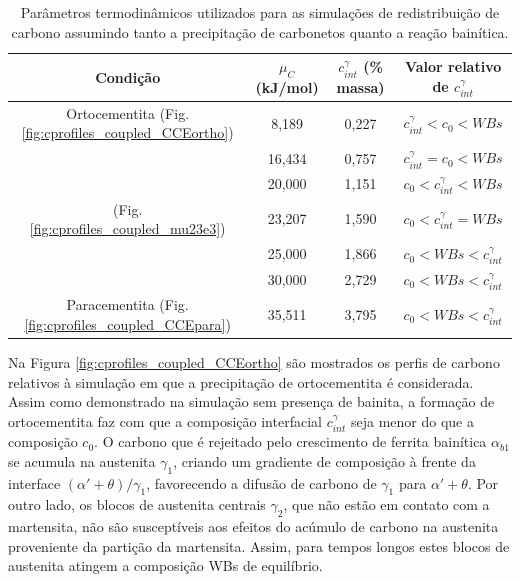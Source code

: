 \begin{table}
  \centering
  \caption{Parâmetros termodinâmicos utilizados para as simulações de redistribuição de carbono assumindo tanto a precipitação de carbonetos quanto a reação bainítica.}
  \begin{tabular}{cccc}
    \hline
    Condição & $\mu_C$ (kJ/mol) & $c^\gamma_{int}$ (\% massa) & Valor relativo de $c^\gamma_{int}$\\
    \hline
    Ortocementita (Fig. \ref{fig:cprofiles_coupled_CCEortho}) & 8,189 & 0,227 & $c^\gamma_{int} < c_0 < WBs$ \\
    & 16,434 & 0,757 & $c^\gamma_{int} = c_0 < WBs$ \\
    & 20,000 & 1,151 & $c_0 < c^\gamma_{int} < WBs$ \\
    (Fig. \ref{fig:cprofiles_coupled_mu23e3}) & 23,207 & 1,590 & $c_0 < c^\gamma_{int} = WBs$ \\
    & 25,000 & 1,866 & $c_0 < WBs < c^\gamma_{int}$ \\
    & 30,000 & 2,729 & $c_0 < WBs < c^\gamma_{int}$ \\
    Paracementita (Fig. \ref{fig:cprofiles_coupled_CCEpara}) & 35,511 & 3,795 & $c_0 < WBs < c^\gamma_{int}$ \\
    \hline
  \end{tabular}
  \label{tab:cpartition_bainite_CCEtheta}
\end{table}

Na Figura \ref{fig:cprofiles_coupled_CCEortho} são mostrados os perfis de carbono relativos à simulação em que a precipitação de ortocementita é considerada. Assim como demonstrado na simulação sem presença de bainita, a formação de ortocementita faz com que a composição interfacial $c^\gamma_{int}$ seja menor do que a composição $c_0$. O carbono que é rejeitado pelo crescimento de ferrita bainítica $\alpha_{b1}$ se acumula na austenita $\gamma_1$, criando um gradiente de composição à frente da interface $(\alpha' + \theta)/\gamma_1$, favorecendo a difusão de carbono de $\gamma_1$ para $\alpha' + \theta$. Por outro lado, os blocos de austenita centrais $\gamma_2$, que não estão em contato com a martensita, não são susceptíveis aos efeitos do acúmulo de carbono na austenita proveniente da partição da martensita. Assim, para tempos longos estes blocos de austenita atingem a composição WBs de equilíbrio.

